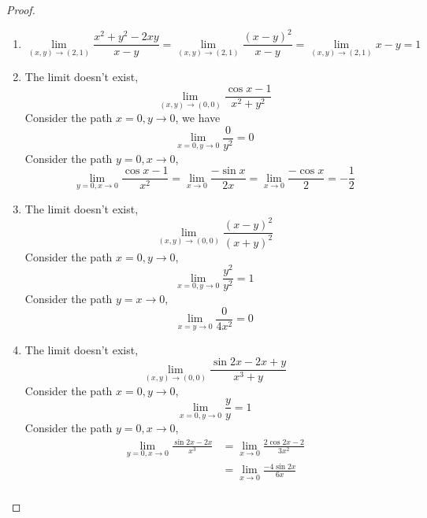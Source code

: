 \documentclass[openany]{book}
\begin{document}
\begin{proof}
    \begin{enumerate}
        \item \begin{equation*}
            \lim_{(x,y)\to(2,1)}\frac{x^2+y^2-2xy}{x-y}=\lim_{(x,y)\to(2,1)}\frac{(x-y)^2}{x-y}=\lim_{(x,y)\to(2,1)}x-y=1
        \end{equation*}
        \item The limit doesn't exist, \begin{equation*}
            \lim_{(x,y)\to(0,0)}\frac{\cos x-1}{x^2+y^2}
        \end{equation*}
        Consider the path $x=0, y\to 0$, we have 
        \begin{equation*}
            \lim_{x=0,y\to 0}\frac{0}{y^2}=0
        \end{equation*}
        Consider the path $y=0, x\to 0$, 
        \begin{equation*}
            \lim_{y=0, x\to 0}\frac{\cos x-1}{x^2}=\lim_{x\to 0}\frac{-\sin x}{2x}=\lim_{x\to 0}\frac{-\cos x}{2}=-\frac{1}{2}
        \end{equation*}
        \item The limit doesn't exist, \begin{equation*}
            \lim_{(x,y)\to (0,0)}\frac{(x-y)^2}{(x+y)^2}
        \end{equation*}
        Consider the path $x=0, y\to 0$, 
        \begin{equation*}
            \lim_{x=0,y\to 0}\frac{y^2}{y^2}=1
        \end{equation*}
        Consider the path $y=x\to 0$, 
        \begin{equation*}
            \lim_{x=y\to 0}\frac{0}{4x^2}=0
        \end{equation*}
        \item The limit doesn't exist, \begin{equation*}
            \lim_{(x,y)\to(0,0)}\frac{\sin 2x-2x+y}{x^3+y}
        \end{equation*}
        Consider the path $x=0, y\to 0$,
        \begin{equation*}
            \lim_{x=0, y\to 0}\frac{y}{y}=1
        \end{equation*}
        Consider the path $y=0, x\to 0$, 
        \begin{align*}
            \lim_{y=0, x\to 0}\frac{\sin 2x-2x}{x^3}&=\lim_{x\to 0}\frac{2\cos 2x-2}{3x^2}\\
            &=\lim_{x\to 0}\frac{-4\sin 2x}{6x}\\

\end{align*}
\end{enumerate}
\end{proof}
\end{document}
